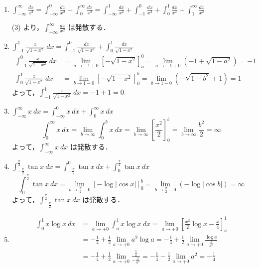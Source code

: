 \documentclass[a4paper,10pt, uplatex, dvipdfmx]{jsarticle}
\newcommand{\ds}{\displaystyle}
\begin{document}
\begin{enumerate}[(1)]
\item $\ds \int_{-\infty}^{\infty} \frac{dx}{x^2} = \int_{-\infty}^{0}\frac{dx}{x^2} + \int_{0}^{\infty}\frac{dx}{x^2}
  = \int_{-\infty}^{1}\frac{dx}{x^2} + \int_{-1}^{0}\frac{dx}{x^2} + \int_{0}^{1}\frac{dx}{x^2}
  + \int_{1}^{\infty}\frac{dx}{x^2}$

  \vspace{1zh}
  
  (3) より，$\ds \int_{-\infty}^{\infty} \frac{dx}{x^2}$ は発散する．

\item $\ds \int_{-1}^{1} \frac{x}{\sqrt{1-x^2}}\ dx
  = \int_{-1}^{0}\frac{dx}{\sqrt{1-x^2}} + \int_{0}^{1}\frac{dx}{\sqrt{1-x^2}}$
  \[
    \begin{aligned}
      \int_{-1}^{0}\frac{x}{\sqrt{1-x^2}}\ dx &=\lim_{a \to -1+0}\left[ -\sqrt{1-x^2} \right]_{a}^{0}
      = \lim_{a \to -1+0}\left( -1 +\sqrt{1-a^2}\right) = -1\\
      \int_{0}^{1}\frac{x}{\sqrt{1-x^2}}\ dx &= \lim_{b \to 1-0}\left[-\sqrt{1-x^2}\right]_{0}^{b}
      = \lim_{b \to 1-0}\left( -\sqrt{1-b^2} +1\right)=1
    \end{aligned}
  \]
  よって，$\ds \int_{-1}^{1}\frac{x}{\sqrt{1-x^2}}\ dx = -1+1=0$.
  
\item $\ds \int_{-\infty}^{\infty} x \ dx = \int_{-\infty}^{0}x \ dx + \int_{0}^{\infty}x \ dx$
  \[
    \int_{0}^{\infty} x \ dx = \lim_{b \to \infty} \int_{0}^{b} x \ dx
    = \lim_{b \to \infty} \left[\frac{x^2}{2}\right]_{0}^{b}= \lim_{b \to \infty} \frac{b^2}{2} = \infty
  \]
  よって，$\ds \int_{-\infty}^{\infty}x \ dx$ は発散する．

\item $\ds \int_{-\frac{\pi}{2}}^{\frac{\pi}{2}}\tan x\ dx
  = \int_{-\frac{\pi}{2}}^{0}\tan x \ dx  + \int_{0}^{\frac{\pi}{2}}\tan x \ dx$
  \[
    \int_{0}^{\frac{\pi}{2}} \tan x \ dx = \lim_{b \to \frac{\pi}{2}-0} \left[ -\log| \cos x|\right]_{0}^{b}
    = \lim_{b \to \frac{\pi}{2}-0}\left( -\log | \cos b|\right)= \infty
  \]
  よって，$\ds \int_{-\frac{\pi}{2}}^{\frac{\pi}{2}}\tan x \ dx$ は発散する．
  
\item
  \[
    \begin{aligned}
      \int_{0}^{1} x \log x\ dx &= \lim_{a \to +0}\int_{a}^{1}x \log x \ dx
      = \lim_{a \to +0} \left[ \frac{x^2}{2}\log x - \frac{x}{4}\right]_{a}^{1}\\
      &= -\frac{1}{4} + \frac{1}{2}\lim_{a \to +0}a^2 \log a
      = -\frac{1}{4} + \frac{1}{2}\lim_{a \to +0} \frac{\log a}{\frac{1}{a^2}}\\
      &= -\frac{1}{4} + \frac{1}{2}\lim_{a \to +0}\frac{\frac{1}{a}}{-\frac{2}{a^3}}
      = -\frac{1}{4} - \frac{1}{2}\lim_{a \to +0}a^2 = -\frac{1}{4}
    \end{aligned}
  \]


\end{enumerate}
\end{document}
